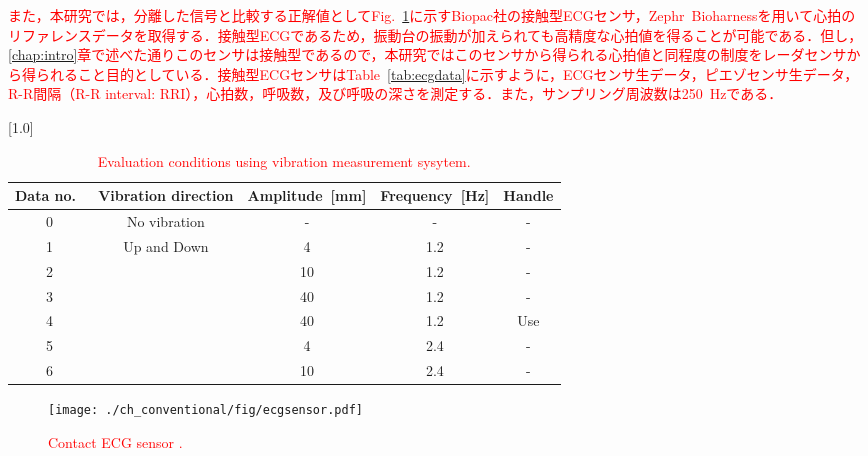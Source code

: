 \textcolor{red}{また，本研究では，分離した信号と比較する正解値としてFig.~\ref{fig:ecgsensor}に示すBiopac社の接触型ECGセンサ，Zephr~Bioharnessを用いて心拍のリファレンスデータを取得する．接触型ECGであるため，振動台の振動が加えられても高精度な心拍値を得ることが可能である．但し，\ref{chap:intro}章で述べた通りこのセンサは接触型であるので，本研究ではこのセンサから得られる心拍値と同程度の制度をレーダセンサから得られること目的としている．接触型ECGセンサはTable~\ref{tab:ecgdata}に示すように，ECGセンサ生データ，ピエゾセンサ生データ，R-R間隔（R-R interval: RRI），心拍数，呼吸数，及び呼吸の深さを測定する．また，サンプリング周波数は250~Hzである．}


\begin{table}[tb]
  \caption{\textcolor{red}{Evaluation conditions using vibration measurement sysytem.}}
  \centering
  \scalebox{1.0}[1.0]{
  \begin{tabular}{|c|c|c|c|c|} \hline
    Data no.~ & Vibration direction & Amplitude~[mm] & Frequency~[Hz] &  Handle \\ \hline \hline
    0 & No vibration & - & - & - \\ \hline
    1 & \multirow{6}{*}{Up and Down} & 4 & 1.2 & - \\ \cline{1-1} \cline{3-5}
    2 & & 10 & 1.2 & - \\ \cline{1-1} \cline{3-5}
    3 & & 40 & 1.2 & - \\ \cline{1-1} \cline{3-5}
    4 & & 40 & 1.2 & Use \\ \cline{1-1} \cline{3-5}
    5 & & 4 & 2.4 & -\\ \cline{1-1} \cline{3-5}
    6 & & 10 & 2.4 & - \\ \hline
  \end{tabular}
  }
  \label{tab:vibevacondition}
\end{table}

\begin{figure}[tb]
\centering
\texttt{[image: ./ch\_conventional/fig/ecgsensor.pdf]}
\caption{\textcolor{red}{Contact ECG sensor \cite{bioharness}.}}
\label{fig:ecgsensor}
\end{figure}

